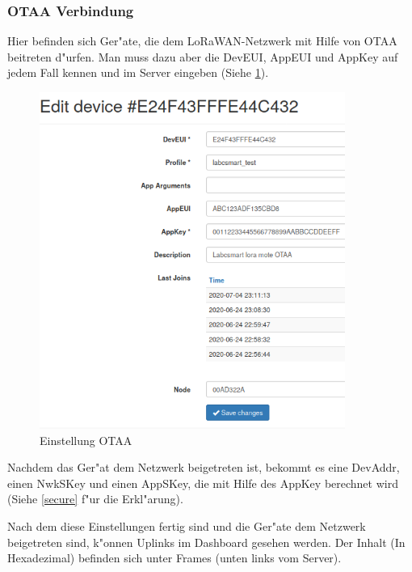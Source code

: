 \vspace{10cm}
\subsubsection{OTAA Verbindung}
Hier befinden sich Ger"ate, die dem LoRaWAN-Netzwerk mit Hilfe von OTAA
beitreten d"urfen. Man muss dazu aber die DevEUI, AppEUI und AppKey auf
jedem Fall kennen und im Server eingeben (Siehe \ref{fig:otaa}). 
	\begin{figure}[h]
	\centering
	\includegraphics[width=10cm]{source/images/Labcsmart_otaa_gen}
	\caption{Einstellung OTAA\label{fig:otaa}}
\end{figure}
Nachdem das Ger"at dem Netzwerk beigetreten ist, bekommt es eine
DevAddr, einen NwkSKey und einen AppSKey, die mit Hilfe des AppKey
berechnet wird (Siehe \ref{secure} f"ur die Erkl"arung). 
\vspace{10cm}

Nach dem diese Einstellungen fertig sind und die Ger"ate dem Netzwerk
beigetreten sind, k"onnen Uplinks im Dashboard gesehen werden. Der
Inhalt (In Hexadezimal) befinden sich unter Frames (unten links vom
Server). 

